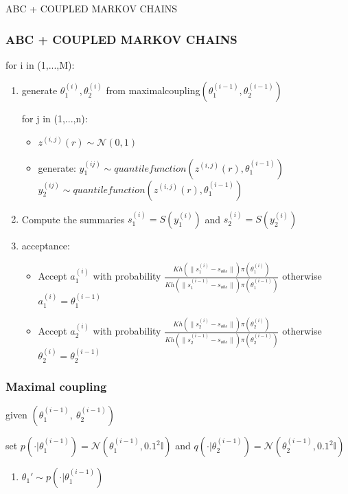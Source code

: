 \documentclass{beamer}
\begin{document}
\begin{section}{ABC + COUPLED MARKOV CHAINS}
\begin{frame}
\end{frame}
\begin{frame}
\frametitle{ABC + COUPLED MARKOV CHAINS}
for i in (1,...,M):
\begin{enumerate}
	\item 	generate $\theta_{1}^{(i)},\theta_{2}^{(i)}$  from maximalcoupling$(\theta_{1}^{(i-1)},\theta_{2}^{(i-1)})$
	
	\begin{block}
		
		for j in (1,...,n):
		\begin{itemize}
			\item $z^{(i,j)}(r) \sim \mathcal{N}(0,1)$
			\item generate:
			$ y_{1}^{(ij)} \sim quantile function(z^{(i,j)}(r), \theta_{1}^{(i-1)})$
			$ y_{2}^{(ij)} \sim quantile function(z^{(i,j)}(r), \theta_{1}^{(i-1)})$
			
		\end{itemize}
	\end{block}
	\item Compute the summaries  $ s_{1}^{(i)} =S(y_{1}^{(i)})$ and $ s_{2}^{(i)} =S(y_{2}^{(i)})$
	
	
	\item acceptance:
	\begin{itemize}
		\item Accept $a_{1}^{(i)}$ with probability $\frac{Kh(\|s_{1}^{(i)}-s_{obs}\|)\pi(\theta_{1}^{(i)})}{Kh(\|s_{1}^{(i-1)}- s_{obs}\|)\pi(\theta_{1}^{(i-1)})} $   otherwise $a_{1}^{(i)}=\theta_{1}^{(i-1)}$
		
		\item Accept $a_{2}^{(i)}$ with probability $\frac{Kh(\|s_{2}^{(i)}-s_{obs}\|)\pi(\theta_{2}^{(i)})}{Kh(\|s_{2}^{(i-1)}-s_{obs}\|)\pi(\theta_{2}^{(i-1)})} $  otherwise $  \theta_{2}^{(i)}=\theta_{2}^{(i-1)}$
	\end{itemize}
\end{enumerate}
\end{frame}

\begin{frame}
\frametitle{Maximal coupling}
given  $(\theta_{1}^{(i-1)}, \ \theta_{2}^{(i-1)})$

set	$p( \cdot |\theta_{1}^{(i-1)})= \mathcal{N}(\theta_{1}^{(i-1)},0.1^2\mathbb{I})$ and $q( \cdot |\theta_{2}^{(i-1)})= \mathcal{N}(\theta_{2}^{(i-1)},0.1^2\mathbb{I})$
\begin{enumerate}
	\item $ \theta_{1}' \sim p( \cdot |\theta_{1}^{(i-1)} ) $
	

\end{enumerate}
\end{frame}
\end{section}
\end{document}
